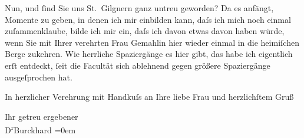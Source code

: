 \pstart
           {\pb}Nun, und{ }ſind Sie uns St. Gilgnern ganz untreu geworden? Da es anfängt, Momente zu
               geben, in denen ich mir einbilden kann, daſs ich mich noch einmal zuſammenklaube,
               bilde ich mir ein, daſs ich davon etwas davon haben würde, wenn Sie mit Ihrer
               verehrten Frau Gemahlin hier
               wieder einmal in die heimiſchen Berge zukehren. Wie herrliche Spaziergänge es hier
               gibt, das habe ich eigentlich erſt entdeckt,{ }ſeit die Facultät sich ablehnend gegen
               größere Spaziergänge ausgeſprochen hat.\pend
           
\pstart
           {\pb}In herzlicher Verehrung mit Handkuſs an
               Ihre liebe Frau und
               herzlichſtem Gruß\pend
           
\pstart
           Ihr getreu ergebener{\\[\baselineskip]}\spacefill\mbox{D\textsuperscript{r}Burckhard}\pend
           \leftskip=0em{}\endnumbering{}  \newcommand{\dateiname}{L01783}\newcommand{\titel}{Max Burckhard an Arthur Schnitzler, 14. 7. 1908}\newcommand{\editorInnen}{Martin Anton Müller und Gerd-Hermann Susen}
